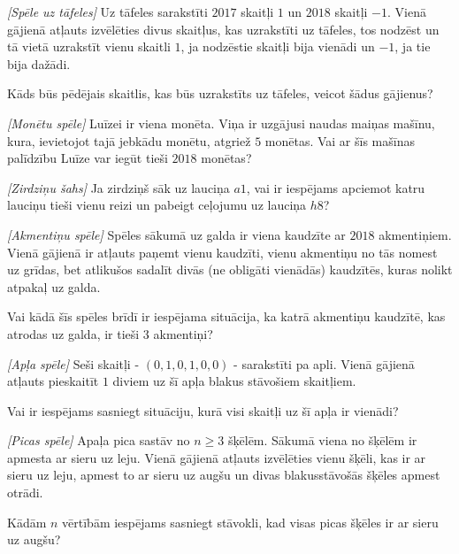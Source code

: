 






\noindent 



\begin{problem}
\textit{[Spēle uz tāfeles]}
Uz tāfeles sarakstīti $2017$ skaitļi $1$ un $2018$ skaitļi $-1$. Vienā gājienā atļauts izvēlēties divus skaitļus, kas uzrakstīti uz tāfeles, tos nodzēst un tā vietā uzrakstīt vienu skaitli $1$, ja nodzēstie skaitļi bija vienādi un $-1$, ja tie bija dažādi.

Kāds būs pēdējais skaitlis, kas būs uzrakstīts uz tāfeles, veicot šādus gājienus?

\end{problem}
%

\begin{problem}
\textit{[Monētu spēle]}
Luīzei ir viena monēta. Viņa ir uzgājusi naudas maiņas mašīnu, kura, ievietojot tajā jebkādu monētu, atgriež $5$ monētas.
Vai ar šīs mašīnas palīdzību Luīze var iegūt tieši $2018$ monētas?
\end{problem}
%

\begin{problem}
\textit{[Zirdziņu šahs]}
Ja zirdziņš sāk uz lauciņa $a1$, vai ir iespējams apciemot katru lauciņu tieši vienu reizi un pabeigt ceļojumu uz lauciņa $h8$?
\end{problem}
%

\begin{problem}
\textit{[Akmentiņu spēle]}
Spēles sākumā uz galda ir viena kaudzīte ar $2018$ akmentiņiem. Vienā gājienā ir atļauts paņemt vienu kaudzīti, vienu akmentiņu no tās nomest uz grīdas, bet atlikušos sadalīt divās (ne obligāti vienādās) kaudzītēs, kuras nolikt atpakaļ uz galda. 

Vai kādā šīs spēles brīdī ir iespējama situācija, ka katrā akmentiņu kaudzītē, kas atrodas uz galda, ir tieši $3$ akmentiņi?
\end{problem}
%

\begin{problem}
\textit{[Apļa spēle]}
Seši skaitļi - $(0,1,0,1,0,0)$ - sarakstīti pa apli. Vienā gājienā atļauts pieskaitīt $1$ diviem uz šī apļa blakus stāvošiem skaitļiem.

Vai ir iespējams sasniegt situāciju, kurā visi skaitļi uz šī apļa ir vienādi?
\end{problem}
%

\begin{problem}
\textit{[Picas spēle]}
Apaļa pica sastāv no  $n\ge3$ šķēlēm. Sākumā viena no šķēlēm ir apmesta ar sieru uz leju. Vienā gājienā atļauts izvēlēties vienu šķēli, kas ir ar sieru uz leju, apmest to ar sieru uz augšu un divas blakusstāvošās šķēles apmest otrādi.

Kādām $n$ vērtībām iespējams sasniegt stāvokli, kad visas picas šķēles ir ar sieru uz augšu?
\end{problem}
%


